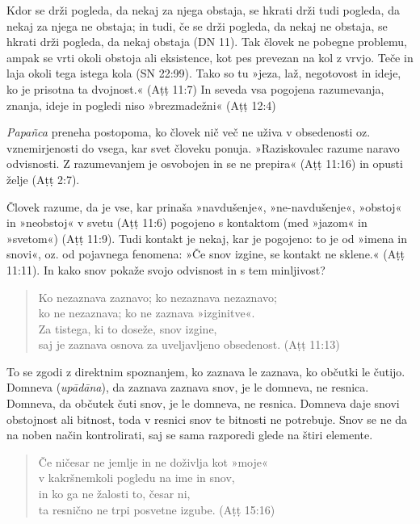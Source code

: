 Kdor se drži pogleda, da nekaj za njega obstaja, se hkrati drži tudi
pogleda, da nekaj za njega ne obstaja; in tudi, če se drži pogleda, da
nekaj ne obstaja, se hkrati drži pogleda, da nekaj obstaja (DN 11). Tak
človek ne pobegne problemu, ampak se vrti okoli obstoja ali eksistence,
kot pes prevezan na kol z vrvjo. Teče in laja okoli tega istega kola (SN
22:99). Tako so tu »jeza, laž, negotovost in ideje, ko je prisotna ta
dvojnost.« (Aṭṭ 11:7) In seveda vsa pogojena razumevanja, znanja, ideje
in pogledi niso »brezmadežni« (Aṭṭ 12:4)

\emph{Papañca} preneha postopoma, ko človek nič več ne uživa v
obsedenosti oz. vznemirjenosti do vsega, kar svet človeku ponuja.
»Raziskovalec razume naravo odvisnosti. Z razumevanjem je osvobojen in
se ne prepira« (Aṭṭ 11:16) in opusti želje (Aṭṭ 2:7).

Človek razume, da je vse, kar prinaša »navdušenje«, »ne-navdušenje«,
»obstoj« in »neobstoj« v svetu (Aṭṭ 11:6) pogojeno s kontaktom (med
»jazom« in »svetom«) (Aṭṭ 11:9). Tudi kontakt je nekaj, kar je pogojeno:
to je od »imena in snovi«, oz. od pojavnega fenomena: »Če snov
izgine, se kontakt ne sklene.« (Aṭṭ 11:11). In kako snov pokaže
svojo odvisnost in s tem minljivost?
\label{vednostjo-end}

\begin{verse}
Ko nezaznava zaznavo; ko nezaznava nezaznavo;\\
ko ne nezaznava; ko ne zaznava »izginitve«.\\
Za tistega, ki to doseže, snov izgine,\\
saj je zaznava osnova za uveljavljeno obsedenost. (Aṭṭ 11:13)
\end{verse}

To se zgodi z direktnim spoznanjem, ko zaznava le zaznava, ko občutki le
čutijo. Domneva (\emph{upādāna}), da zaznava zaznava snov, je le
domneva, ne resnica. Domneva, da občutek čuti snov, je le domneva,
ne resnica. Domneva daje snovi obstojnost ali bitnost, toda v resnici
snov te bitnosti ne potrebuje. Snov se ne da na noben način
kontrolirati, saj se sama razporedi glede na štiri elemente.

\begin{verse}
Če ničesar ne jemlje in ne doživlja kot »moje«\\
v kakršnemkoli pogledu na ime in snov,\\
in ko ga ne žalosti to, česar ni,\\
ta resnično ne trpi posvetne izgube. (Aṭṭ 15:16)
\end{verse}

